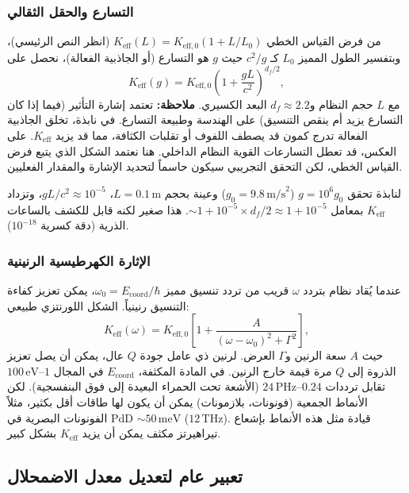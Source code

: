 \documentclass[11pt,a4paper]{article}
\newcommand{\Keff}{K_{\mathrm{eff}}}
\newcommand{\Keffzero}{K_{\mathrm{eff},0}}
\newcommand{\df}{d_{\!f}}
\theoremstyle{remark}
\begin{document}
	\subsubsection{التسارع والحقل الثقالي}
	
	من فرض القياس الخطي \(\Keff(L) = \Keffzero (1 + L/L_0)\) (انظر النص الرئيسي)، وبتفسير الطول المميز \(L_0\) كـ \(c^2/g\) حيث \(g\) هو التسارع (أو الجاذبية الفعالة)، نحصل على
	\begin{equation}
		\Keff(g) = \Keffzero \left(1 + \frac{gL}{c^2}\right)^{\df/2},
		\label{eq:keff-g}
	\end{equation}
	مع \(L\) حجم النظام و\(\df \approx 2.2\) البعد الكسيري. \textbf{ملاحظة:} تعتمد إشارة التأثير (فيما إذا كان التسارع يزيد أم ينقص التنسيق) على الهندسة وطبيعة التسارع. في نابذة، تخلق الجاذبية الفعالة تدرج كمون قد يصطف اللفوف أو تقلبات الكثافة، مما قد يزيد \(\Keff\). على العكس، قد تعطل التسارعات القوية النظام الداخلي. هنا نعتمد الشكل الذي يتبع فرض القياس الخطي، لكن التحقق التجريبي سيكون حاسماً لتحديد الإشارة والمقدار الفعليين.
	
	لنابذة تحقق \(g = 10^6g_0\) (\(g_0 = 9.8\,\text{m/s}^2\)) وعينة بحجم \(L = 0.1\,\text{m}\)، \(gL/c^2 \approx 10^{-5}\)، وتزداد \(\Keff\) بمعامل \(\sim 1 + 10^{-5}\times\df/2 \approx 1 + 10^{-5}\). هذا صغير لكنه قابل للكشف بالساعات الذرية (دقة كسرية \(10^{-18}\)).
	
	\subsubsection{الإثارة الكهرطيسية الرنينية}
	
	عندما يُقاد نظام بتردد \(\omega\) قريب من تردد تنسيق مميز \(\omega_0 = E_{\mathrm{coord}}/\hbar\)، يمكن تعزيز كفاءة التنسيق رنينياً. الشكل اللورنتزي طبيعي:
	\begin{equation}
		\Keff(\omega) = \Keffzero \left[ 1 + \frac{A}{(\omega - \omega_0)^2 + \Gamma^2} \right],
		\label{eq:keff-omega}
	\end{equation}
	حيث \(A\) سعة الرنين و\(\Gamma\) العرض. لرنين ذي عامل جودة \(Q\) عال، يمكن أن يصل تعزيز الذروة إلى \(Q\) مرة قيمة خارج الرنين. في المادة المكثفة، \(E_{\mathrm{coord}}\) في المجال \(1\)–\(100\,\text{eV}\) تقابل ترددات \(0.24\)–\(24\,\text{PHz}\) (الأشعة تحت الحمراء البعيدة إلى فوق البنفسجية). لكن الأنماط الجمعية (فونونات، بلازمونات) يمكن أن يكون لها طاقات أقل بكثير، مثلاً الفونونات البصرية في PdD \(\sim 50\,\text{meV}\) (\(12\,\text{THz}\)). قيادة مثل هذه الأنماط بإشعاع تيراهيرتز مكثف يمكن أن يزيد \(\Keff\) بشكل كبير.
	
	\subsection{تعبير عام لتعديل معدل الاضمحلال}
	
\end{document}
